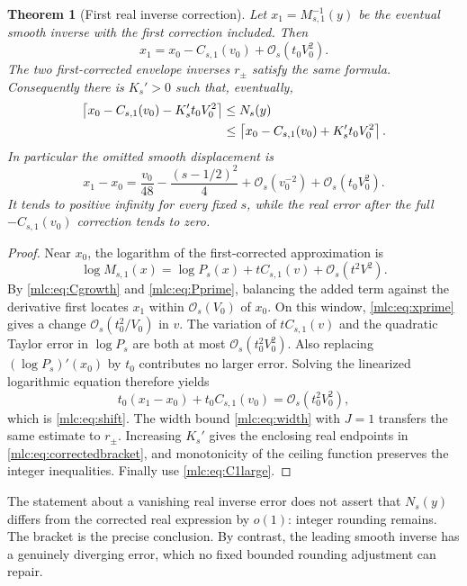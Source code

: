 \documentclass[11pt]{article}
\newtheorem{theorem}{Theorem}[section]
\theoremstyle{remark}\newtheorem{remark}[theorem]{Remark}
\newcommand{\OO}{\mathcal O}
\begin{document}
\begin{theorem}[First real inverse correction]\label{mlc:thm:shift}
Let $x_1=M_{s,1}^{-1}(y)$ be the eventual smooth inverse with the first correction included. Then
\begin{equation}\label{mlc:eq:shift}
 x_1=x_0-C_{s,1}(v_0)+\OO_s(t_0V_0^2).
\end{equation}
The two first-corrected envelope inverses $r_\pm$ satisfy the same formula. Consequently there is $K_s'>0$ such that, eventually,
\begin{align}
 \left\lceil x_0-C_{s,1}(v_0)-K_s't_0V_0^2\right\rceil
 &\le N_s(y)\notag\\
 &\le
 \left\lceil x_0-C_{s,1}(v_0)+K_s't_0V_0^2\right\rceil.
 \label{mlc:eq:correctedbracket}
\end{align}
In particular the omitted smooth displacement is
\begin{equation}\label{mlc:eq:divergent}
 x_1-x_0=\frac{v_0}{48}-\frac{(s-1/2)^2}{4}
                       +\OO_s(v_0^{-2})+\OO_s(t_0V_0^2).
\end{equation}
It tends to positive infinity for every fixed $s$, while the real error after the full $-C_{s,1}(v_0)$ correction tends to zero.
\end{theorem}
\begin{proof}
Near $x_0$, the logarithm of the first-corrected approximation is
\[
 \log M_{s,1}(x)=\log P_s(x)+tC_{s,1}(v)+\OO_s(t^2V^2).
\]
By \eqref{mlc:eq:Cgrowth} and \eqref{mlc:eq:Pprime}, balancing the added term against the derivative first locates $x_1$ within $\OO_s(V_0)$ of $x_0$. On this window, \eqref{mlc:eq:xprime} gives a change $\OO_s(t_0^2/V_0)$ in $v$. The variation of $tC_{s,1}(v)$ and the quadratic Taylor error in $\log P_s$ are both at most $\OO_s(t_0^2V_0^2)$. Also replacing $(\log P_s)'(x_0)$ by $t_0$ contributes no larger error. Solving the linearized logarithmic equation therefore yields
\[
 t_0(x_1-x_0)+t_0C_{s,1}(v_0)
                        =\OO_s(t_0^2V_0^2),
\]
which is \eqref{mlc:eq:shift}. The width bound \eqref{mlc:eq:width} with $J=1$ transfers the same estimate to $r_\pm$. Increasing $K_s'$ gives the enclosing real endpoints in \eqref{mlc:eq:correctedbracket}, and monotonicity of the ceiling function preserves the integer inequalities. Finally use \eqref{mlc:eq:C1large}.
\end{proof}

The statement about a vanishing real inverse error does not assert that $N_s(y)$ differs from the corrected real expression by $o(1)$: integer rounding remains. The bracket is the precise conclusion. By contrast, the leading smooth inverse has a genuinely diverging error, which no fixed bounded rounding adjustment can repair.
\end{document}
